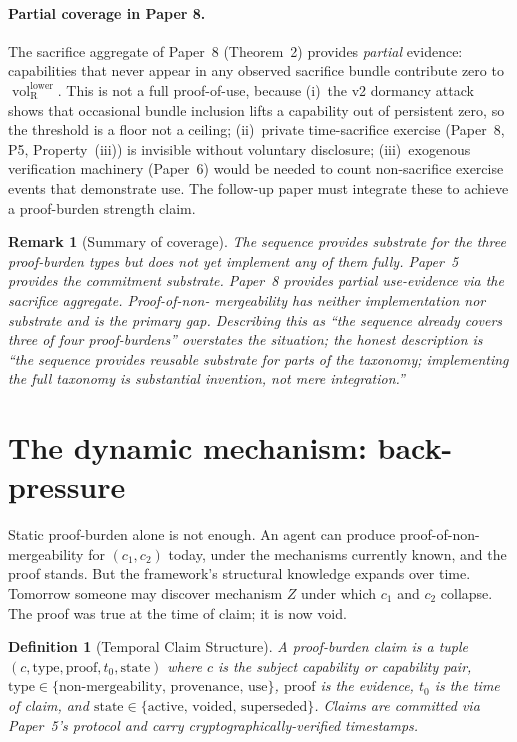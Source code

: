 \documentclass{article}
\newtheorem{definition}{Definition}
\newtheorem{remark}{Remark}
\DeclareMathOperator{\vol}{vol}
\newcommand{\volRlower}{{\vol_{\mathrm{R}}^{\mathrm{lower}}}}
\begin{document}
\paragraph{Partial coverage in Paper 8.}
The sacrifice aggregate of Paper~8 (Theorem~2) provides
\emph{partial} evidence: capabilities that never appear in any
observed sacrifice bundle contribute zero to $\volRlower$.  This
is not a full proof-of-use, because (i)~the v2 dormancy attack
shows that occasional bundle inclusion lifts a capability out of
persistent zero, so the threshold is a floor not a ceiling;
(ii)~private time-sacrifice exercise (Paper~8, P5, Property~(iii))
is invisible without voluntary disclosure; (iii)~exogenous
verification machinery (Paper~6) would be needed to count
non-sacrifice exercise events that demonstrate use.  The follow-up
paper must integrate these to achieve a proof-burden strength
claim.

\begin{remark}[Summary of coverage]
\label{rem:coverage}
The sequence provides \emph{substrate} for the three proof-burden
types but does not yet implement any of them fully.  Paper~5
provides the commitment substrate.  Paper~8 provides partial
use-evidence via the sacrifice aggregate.  Proof-of-non-
mergeability has neither implementation nor substrate and is the
primary gap.  Describing this as ``the sequence already covers
three of four proof-burdens'' overstates the situation; the
honest description is ``the sequence provides reusable substrate
for parts of the taxonomy; implementing the full taxonomy is
substantial invention, not mere integration.''
\end{remark}

\section{The dynamic mechanism: back-pressure}

Static proof-burden alone is not enough.  An agent can produce
proof-of-non-mergeability for $(c_1, c_2)$ today, under the
mechanisms currently known, and the proof stands.  But the
framework's structural knowledge expands over time.  Tomorrow
someone may discover mechanism $Z$ under which $c_1$ and $c_2$
collapse.  The proof was true at the time of claim; it is now
void.

\begin{definition}[Temporal Claim Structure]
\label{def:temporal_claim}
A proof-burden claim is a tuple
$(c, \mathrm{type}, \mathrm{proof}, t_0, \mathrm{state})$ where
$c$ is the subject capability or capability pair, $\mathrm{type}
\in \{\text{non-mergeability, provenance, use}\}$, $\mathrm{proof}$
is the evidence, $t_0$ is the time of claim, and $\mathrm{state}
\in \{\text{active, voided, superseded}\}$.  Claims are committed
via Paper~5's protocol and carry cryptographically-verified
timestamps.
\end{definition}
\end{document}
